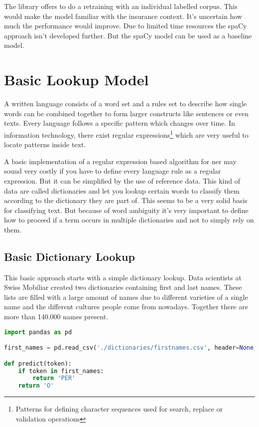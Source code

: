 The library offers to do a retraining with an individual labelled corpus. This would make the model familiar with the insurance context. It's uncertain
how much the performance would improve. Due to limited time resources the spaCy approach isn't developed further. But the spaCy model can be used as a baseline model.

\section{Basic Lookup Model}
\label{chap:regex-model}
A written language consists of a word set and a rules set to describe how single words can be combined together to form larger constructs
like sentences or even texts. Every language follows a specific pattern which changes over time. In information technology, there exist
regular expressions\footnote{Patterns for defining character sequences used for search, replace or validation operations} which are very useful
to locate patterns inside text.

A basic implementation of a regular expression based algorithm for \acrlong{ner} may sound very costly if you have to define every language rule
as a regular expression. But it can be simplified by the use of reference data. This kind of data are called dictionaries and let you lookup
certain words to classify them according to the dictionary they are part of. This seems to be a very solid basis for classifying text. But because
of word ambiguity it's very important to define how to proceed if a term occurs in multiple dictionaries and not to simply rely on them.

\subsection{Basic Dictionary Lookup}

This basic approach starts with a simple dictionary lookup. Data scientists at Swiss Mobiliar created two dictionaries containing first and last names.
These lists are filled with a large amount of names due to different varieties of a single name and the different cultures people come from nowadays.
Together there are more than 140.000 names present.

\begin{lstlisting}[language=Python, label={code:regex-dict-lookup}, caption=Simple dictionary lookup]
import pandas as pd

first_names = pd.read_csv('./dictionaries/firstnames.csv', header=None, encoding='cp1252')[0]

def predict(token):
    if token in first_names:
        return 'PER'
    return 'O'
\end{lstlisting}

